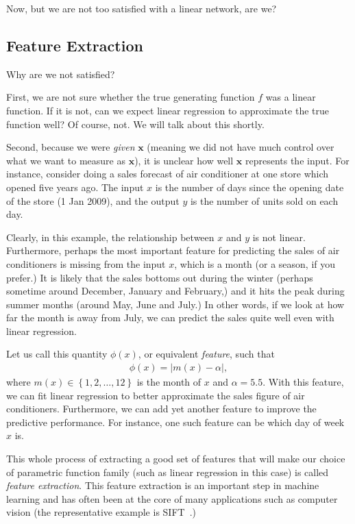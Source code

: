 \documentclass{report}
\newcommand{\vect}[1]{\mathbf{#1}}
\newcommand{\vx}[0]{\vect{x}}
\begin{document}
Now, but we are not too satisfied with a linear network, are we?

\subsection{Feature Extraction}
\label{sec:feature_extraction}

Why are we not satisfied?

First, we are not sure whether the true generating function $f$ was a linear
function. If it is not, can we expect linear regression to approximate the true
function well? Of course, not. We will talk about this shortly.

Second, because we were {\em given} $\vx$ (meaning we did not have much control
over what we want to measure as $\vx$), it is unclear how well $\vx$ represents
the input. For instance, consider doing a sales forecast of air conditioner at
one store which opened five years ago. The input $x$ is the number of days since
the opening date of the store (1 Jan 2009), and the output $y$ is the number of
units sold on each day.

Clearly, in this example, the relationship between $x$ and $y$ is not linear.
Furthermore, perhaps the most important feature for predicting the sales of air
conditioners is missing from the input $x$, which is a month (or a season, if
you prefer.) It is likely that the sales bottoms out during the winter (perhaps
sometime around December, January and February,) and it hits the peak during
summer months (around May, June and July.) In other words, if we look at how far
the month is away from July, we can predict the sales quite well even with 
linear regression.

Let us call this quantity $\phi(x)$, or equivalent {\em feature}, such that
\begin{align}
    \label{eq:feat_month}
    \phi(x) = \left| m(x) - \alpha \right|,
\end{align}
where $m(x) \in \left\{ 1,2,\ldots,12\right\}$ is the month of $x$ and
$\alpha=5.5$.  With this
feature, we can fit linear regression to better approximate the sales figure of
air conditioners. Furthermore, we can add yet another feature to improve the
predictive performance. For instance, one such feature can be which day of week
$x$ is. 

This whole process of extracting a good set of features that will make our
choice of parametric function family (such as linear regression in this case) is
called {\em feature extraction}. This feature extraction is an important step in
machine learning and has often been at the core of many applications such as
computer vision (the representative example is SIFT~\cite{lowe1999object}.)
\end{document}
